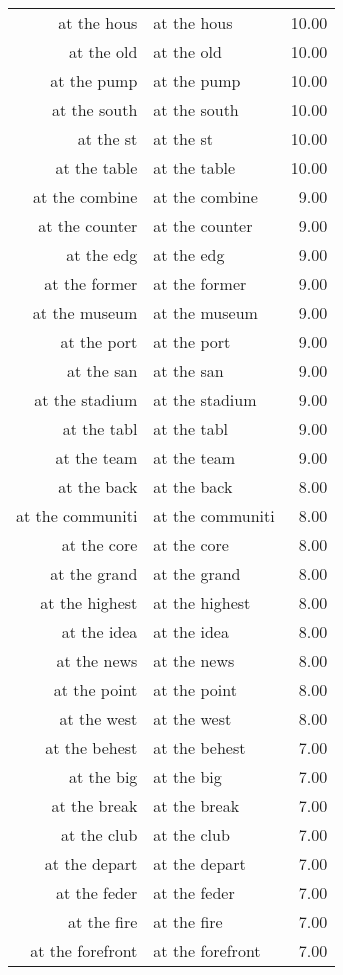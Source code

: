 \begin{table}[ht]
\begin{tabular}{rlr}
  at the hous & at the hous & 10.00 \\ 
  at the old & at the old & 10.00 \\ 
  at the pump & at the pump & 10.00 \\ 
  at the south & at the south & 10.00 \\ 
  at the st & at the st & 10.00 \\ 
  at the table & at the table & 10.00 \\ 
  at the combine & at the combine & 9.00 \\ 
  at the counter & at the counter & 9.00 \\ 
  at the edg & at the edg & 9.00 \\ 
  at the former & at the former & 9.00 \\ 
  at the museum & at the museum & 9.00 \\ 
  at the port & at the port & 9.00 \\ 
  at the san & at the san & 9.00 \\ 
  at the stadium & at the stadium & 9.00 \\ 
  at the tabl & at the tabl & 9.00 \\ 
  at the team & at the team & 9.00 \\ 
  at the back & at the back & 8.00 \\ 
  at the communiti & at the communiti & 8.00 \\ 
  at the core & at the core & 8.00 \\ 
  at the grand & at the grand & 8.00 \\ 
  at the highest & at the highest & 8.00 \\ 
  at the idea & at the idea & 8.00 \\ 
  at the news & at the news & 8.00 \\ 
  at the point & at the point & 8.00 \\ 
  at the west & at the west & 8.00 \\ 
  at the behest & at the behest & 7.00 \\ 
  at the big & at the big & 7.00 \\ 
  at the break & at the break & 7.00 \\ 
  at the club & at the club & 7.00 \\ 
  at the depart & at the depart & 7.00 \\ 
  at the feder & at the feder & 7.00 \\ 
  at the fire & at the fire & 7.00 \\ 
  at the forefront & at the forefront & 7.00 \\ 

\end{tabular}
\end{table}

